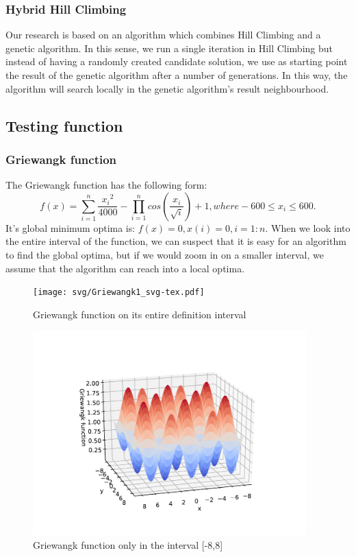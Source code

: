 \documentclass{article}
\begin{document}
\subsubsection{Hybrid Hill Climbing}
Our research is based on an algorithm which combines Hill Climbing and a genetic algorithm. In this sense, we run a single iteration in Hill Climbing but instead of having a randomly created candidate solution, we use as starting point the result of the genetic algorithm after a number of generations. In this way, the algorithm will search locally in the genetic algorithm's result neighbourhood.
\subsection{Testing function}
\subsubsection{Griewangk function}
The Griewangk function has the following form:
$$f(x) = \sum_{i = 1}^n \frac{{x_i}^2}{4000} - \prod_{i = 1}^n cos\left(\frac{x_i}{\sqrt{i}}\right) + 1, where -600 \leq x_i \leq 600.$$
It's global minimum optima is: $f(x) = 0, x(i) = 0, i = 1:n$. When we look into the entire interval of the function, we can suspect that it is easy for an algorithm to find the global optima, but if we would zoom in on a smaller interval, we assume that the algorithm can reach into a local optima.
\begin{figure}[h!]
  \centering
  \texttt{[image: svg/Griewangk1\_svg-tex.pdf]}
  \caption{Griewangk function on its entire definition interval}
\end{figure}
\begin{figure}[h!]
  \centering
  \includegraphics[width = 300pt]{svg/Griewangk2_svg-tex.pdf}
  \caption{Griewangk function only in the interval [-8,8]}
\end{figure}
\end{document}
